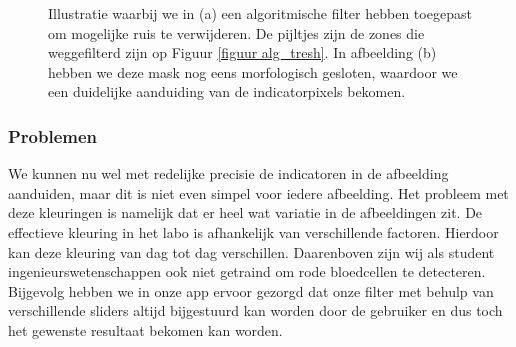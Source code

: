 \documentclass[a4paper,kulak]{kulakarticle}
\begin{document}
\begin{figure}[H]
	\centering
	\qquad
	
	\caption{Illustratie waarbij we in (a) een algoritmische filter hebben toegepast om mogelijke ruis te verwijderen. De pijltjes zijn de zones die weggefilterd zijn op Figuur \ref{figuur alg_tresh}. In afbeelding (b) hebben we deze mask nog eens morfologisch gesloten, waardoor we een duidelijke aanduiding van de indicatorpixels bekomen.}
	\label{figuur morf}
\end{figure}

\subsubsection{Problemen}
We kunnen nu wel met redelijke precisie de indicatoren in de afbeelding aanduiden, maar dit is niet even simpel voor iedere afbeelding.
Het probleem met deze kleuringen is namelijk dat er heel wat variatie in de afbeeldingen zit. De effectieve kleuring in het labo is afhankelijk van verschillende factoren. Hierdoor kan deze kleuring van dag tot dag verschillen. Daarenboven zijn wij als student ingenieurswetenschappen ook niet getraind om rode bloedcellen te detecteren. Bijgevolg hebben we in onze app ervoor gezorgd dat onze filter met behulp van verschillende sliders altijd bijgestuurd kan worden door de gebruiker en dus toch het gewenste resultaat bekomen kan worden.
	
	
		
	
	
\end{document}

